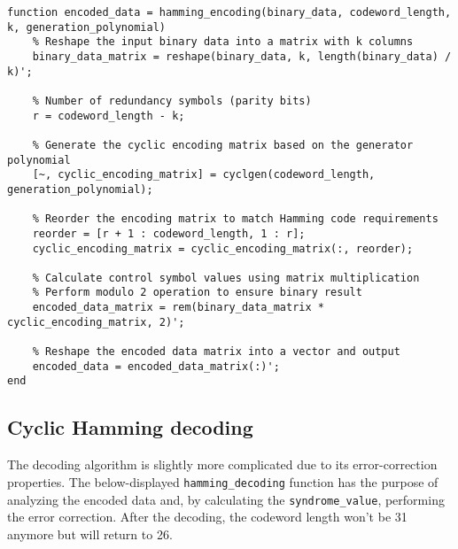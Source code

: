 \begin{lstlisting}
function encoded_data = hamming_encoding(binary_data, codeword_length, k, generation_polynomial)
    % Reshape the input binary data into a matrix with k columns
    binary_data_matrix = reshape(binary_data, k, length(binary_data) / k)';
    
    % Number of redundancy symbols (parity bits)
    r = codeword_length - k;

    % Generate the cyclic encoding matrix based on the generator polynomial
    [~, cyclic_encoding_matrix] = cyclgen(codeword_length, generation_polynomial);
    
    % Reorder the encoding matrix to match Hamming code requirements
    reorder = [r + 1 : codeword_length, 1 : r];
    cyclic_encoding_matrix = cyclic_encoding_matrix(:, reorder);
    
    % Calculate control symbol values using matrix multiplication
    % Perform modulo 2 operation to ensure binary result
    encoded_data_matrix = rem(binary_data_matrix * cyclic_encoding_matrix, 2)';
    
    % Reshape the encoded data matrix into a vector and output
    encoded_data = encoded_data_matrix(:)';
end
\end{lstlisting}


\subsection{Cyclic Hamming decoding}\label{hamming-decoding}
The decoding algorithm is slightly more complicated due to its error-correction properties. The below-displayed \texttt{hamming\_decoding} function has the purpose of analyzing the encoded data and, by calculating the \texttt{syndrome\_value}, performing the error correction. After the decoding, the codeword length won't be 31 anymore but will return to 26.

